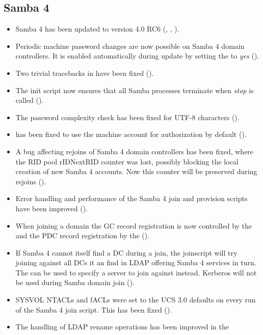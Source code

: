 \subsection{Samba 4}
\begin{itemize}
\item Samba 4 has been updated to version 4.0 RC6 (,
  , ).
\item Periodic machine password changes are now possible on Samba 4
  domain controllers. It is enabled automatically during update by
  setting the  to \emph{yes}
  ().
\item Two trivial tracebacks in
   have been fixed
  ().
\item The  init script now ensures that all Samba
  processes terminate when \emph{stop} is called ().
\item The password complexity check has been fixed for UTF-8 characters
  ().
\item {} has been fixed to use the
  machine account for authorization by default ().
\item A bug affecting rejoins of Samba 4 domain controllers has been fixed, where the
  RID pool rIDNextRID counter was lost, possibly blocking the local
  creation of new Samba 4 accounts. Now this counter will be preserved
  during rejoins ().
\item Error handling and performance of the Samba 4 join and provision
  scripts have been improved ().
\item When joining a domain the GC record registration is now
  controlled by the  and the PDC
  record registration by the 
  ().
\item If Samba 4 cannot itself find a DC during a join, the
   joinscript will try joining against all
  DCs it an find in LDAP offering Samba 4 services in turn. The
   can be used to specify a server to join against
  instead. Kerberos will not be used during Samba domain join
  ().
\item SYSVOL NTACLs and fACLs were set to the UCS 3.0 defaults on
  every run of the Samba 4 join script. This has been fixed
  ().
\item The handling of LDAP rename operations has been improved in the

\end{itemize}
